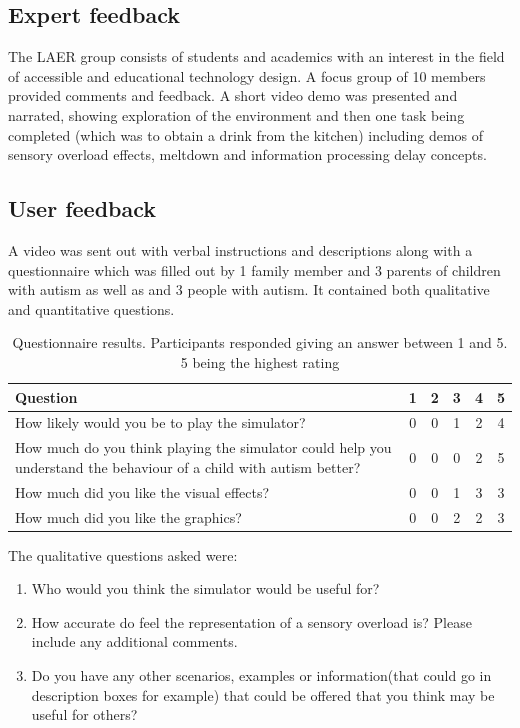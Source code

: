 \documentclass[11pt]{report}
\begin{document}
\subsection{Expert feedback}
The LAER group consists of students and academics with an interest in the field of accessible and educational technology design. A focus group of 10 members provided comments and feedback. A short video demo was presented and narrated, showing exploration of the environment and then one task being completed (which was to obtain a drink from the kitchen) including demos of sensory overload effects, meltdown and information processing delay concepts.

\subsection{User feedback}
A video was sent out with verbal instructions and descriptions along with a questionnaire which was filled out by 1 family member and 3 parents of children with autism as well as and 3 people with autism. It contained both qualitative and quantitative questions.

\begin{table}
\caption{Questionnaire results. Participants responded giving an answer between 1 and 5. 5 being the highest rating}
\begin{tabular}{| p{6cm} | c c c c c |}
\hline
Question & 1 & 2 & 3 & 4 & 5 \\
\hline
How likely would you be to play the simulator? & 0 & 0 & 1 & 2 & 4 \\
\hline
How much do you think playing the simulator could help you understand the behaviour of a child with autism better? & 0 & 0 & 0 & 2 & 5 \\
\hline
How much did you like the visual effects? & 0 & 0 & 1 & 3 & 3 \\
\hline
How much did you like the graphics? & 0 & 0 & 2 & 2 & 3 \\ 
\hline
\end{tabular}
\end{table}

The qualitative questions asked were:
\begin{enumerate}
\item Who would you think the simulator would be useful for?
\item How accurate do feel the representation of a sensory overload is? Please include any additional comments.
\item Do you have any other scenarios, examples or information(that could go in description boxes for example) that could be offered that you think may be useful for others?
\end{enumerate}
\end{document}
